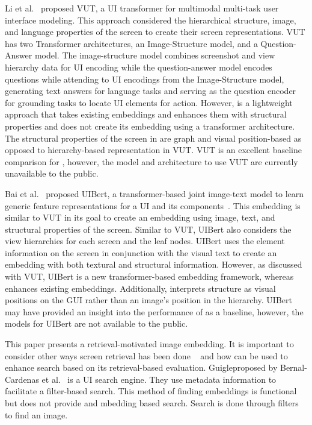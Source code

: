 Li et al.~\cite{li2021vut} proposed VUT, a UI transformer for multimodal multi-task user interface modeling. This approach considered the hierarchical structure, image, and language properties of the screen to create their screen representations. VUT has two Transformer architectures, an Image-Structure model,
and a Question-Answer model. The image-structure model combines screenshot and view hierarchy data for UI encoding while the question-answer model encodes questions while attending to UI encodings from the Image-Structure model, generating text answers for language tasks and serving as the question encoder for grounding tasks to locate UI elements for action. However, \FRAME is a lightweight approach that takes existing embeddings and enhances them with structural properties and does not create its embedding using a transformer architecture. The structural properties of the screen in \FRAME are graph and visual position-based as opposed to hierarchy-based representation in VUT. VUT is an excellent baseline comparison for \FRAME, however, the model and architecture to use VUT are currently unavailable to the public. 

Bai et al.~\cite{bai2021uibert} proposed UIBert, a transformer-based joint image-text model to learn generic feature representations for a UI and its components~\cite{bai2021uibert}. This embedding is similar to VUT in its goal to create an embedding using image, text, and structural properties of the screen. Similar to VUT, UIBert also considers the view hierarchies for each screen and the leaf nodes. UIBert uses the element information on the screen in conjunction with the visual text to create an embedding with both textural and structural information. However, as discussed with VUT, UIBert is a new transformer-based embedding framework, whereas \FRAME enhances existing embeddings. Additionally, \FRAME interprets structure as visual positions on the GUI rather than an image's position in the hierarchy. UIBert may have provided an insight into the performance of \FRAME as a baseline, however, the models for UIBert are not available to the public. 

This paper presents a retrieval-motivated image embedding. It is important to consider other ways screen retrieval has been done ~\cite{Huang19, Bernal-Cardenas19, Chen20} and how \FRAME can be used to enhance search based on its retrieval-based evaluation. Guigleproposed by Bernal-Cardenas et al.~\cite{Bernal-Cardenas19} is a UI search engine. They use metadata information to facilitate a filter-based search. This method of finding embeddings is functional but does not provide and mbedding based search. Search is done through filters to find an image. 

